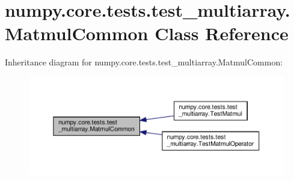 \hypertarget{classnumpy_1_1core_1_1tests_1_1test__multiarray_1_1MatmulCommon}{}\section{numpy.\+core.\+tests.\+test\+\_\+multiarray.\+Matmul\+Common Class Reference}
\label{classnumpy_1_1core_1_1tests_1_1test__multiarray_1_1MatmulCommon}


Inheritance diagram for numpy.\+core.\+tests.\+test\+\_\+multiarray.\+Matmul\+Common\+:
\nopagebreak
\begin{figure}[H]
\begin{center}
\leavevmode
\includegraphics[width=350pt]{classnumpy_1_1core_1_1tests_1_1test__multiarray_1_1MatmulCommon__inherit__graph}
\end{center}
\end{figure}
